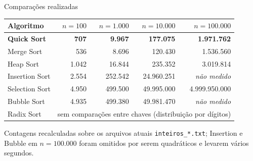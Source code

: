 \documentclass[aspectratio=169,10pt]{beamer}
\begin{document}
\begin{frame}{Comparações realizadas}
 \centering\footnotesize
 \renewcommand{\arraystretch}{1.3}
 \begin{tabular}{@{}lrrrr@{}}
  \toprule
  \textbf{Algoritmo} & $n=100$ & $n=1.000$ & $n=10.000$ & $n=100.000$\\
  \midrule
  \textbf{Quick Sort} & \textbf{707} & \textbf{9.967} & \textbf{177.075} & \textbf{1.971.762}\\
  Merge Sort & 536 & 8.696 & 120.430 & 1.536.560\\
  Heap Sort & 1.042 & 16.844 & 235.352 & 3.019.814\\
  Insertion Sort & 2.554 & 252.542 & 24.960.251 & \textit{não medido}\\
  Selection Sort & 4.950 & 499.500 & 49.995.000 & 4.999.950.000\\
  Bubble Sort & 4.935 & 499.380 & 49.981.470 & \textit{não medido}\\
  Radix Sort & \multicolumn{4}{c}{sem comparações entre chaves (distribuição por dígitos)}\\
  \bottomrule
 \end{tabular}
 \par\vspace{0.6em}
 {\scriptsize Contagens recalculadas sobre os arquivos atuais \texttt{inteiros\_*.txt}; Insertion e Bubble em $n=100.000$ foram omitidos por serem quadráticos e levarem vários segundos.}
\end{frame}
\end{document}
